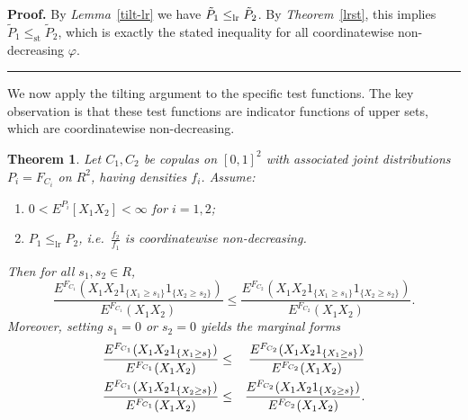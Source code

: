 \documentclass[onecolumn]{article}
\newtheorem{theorem}{Theorem}
\newenvironment{proof}[1][Proof]{\noindent\textbf{#1.} }{\ \rule{0.5em}{0.5em}}
\begin{document}
\begin{proof}
\noindent By \textit{Lemma}~\ref{tilt-lr} we have $\tilde{P}_{1}\leq _{%
\mathrm{lr}}\tilde{P}_{2}$. By \textit{Theorem}~\ref{lrst}, this implies $%
\tilde{P}_{1}\leq _{\mathrm{st}}\tilde{P}_{2}$, which is exactly the stated
inequality for all coordinatewise non-decreasing $\varphi $.
\end{proof}

We now apply the tilting argument to the specific test functions. The key
observation is that these test functions are indicator functions of upper
sets, which are coordinatewise non-decreasing.

\begin{theorem}
\noindent \label{LR} Let $C_{1},C_{2}$ be copulas on $[0,1]^{2}$ with
associated joint distributions $P_{i}=F_{C_{i}}$ on $R^{2}$, having
densities $f_{i}$. Assume:

\begin{enumerate}
\item $0<E^{P_{i}}[X_{1}X_{2}]<\infty $ for $i=1,2$;

\item $P_{1}\leq _{\mathrm{lr}}P_{2}$, i.e.\ $\frac{f_{2}}{f_{1}}$ is
coordinatewise non-decreasing.
\end{enumerate}

Then for all $s_{1},s_{2}\in R$, 
\begin{equation}
\frac{E^{F_{C_{1}}}(X_{1}X_{2}1_{\{X_{1}\geq s_{1}\}}1_{\{X_{2}\geq s_{2}\}})%
}{E^{F_{C_{1}}}(X_{1}X_{2})}\leq \frac{E^{F_{C_{2}}}(X_{1}X_{2}1_{\{X_{1}%
\geq s_{1}\}}1_{\{X_{2}\geq s_{2}\}})}{E^{F_{C_{2}}}(X_{1}X_{2})}.
\label{814}
\end{equation}%
Moreover, setting $s_{1}=0$ or $s_{2}=0$ yields the marginal forms%
\begin{eqnarray}
\frac{E^{F_{C_{1}}}(X_{1}X_{2}1_{\{X_{1}\geq s\}})}{E^{F_{C_{1}}}(X_{1}X_{2})%
} &\leq &\frac{E^{F_{C_{2}}}(X_{1}X_{2}1_{\{X_{1}\geq s\}})}{%
E^{F_{C_{2}}}(X_{1}X_{2})}  \label{815} \\
\frac{E^{F_{C_{1}}}(X_{1}X_{2}1_{\{X_{2}\geq s\}})}{E^{F_{C_{1}}}(X_{1}X_{2})%
} &\leq &\frac{E^{F_{C_{2}}}(X_{1}X_{2}1_{\{X_{2}\geq s\}})}{%
E^{F_{C_{2}}}(X_{1}X_{2})}.  \label{816}
\end{eqnarray}
\end{theorem}
\end{document}
